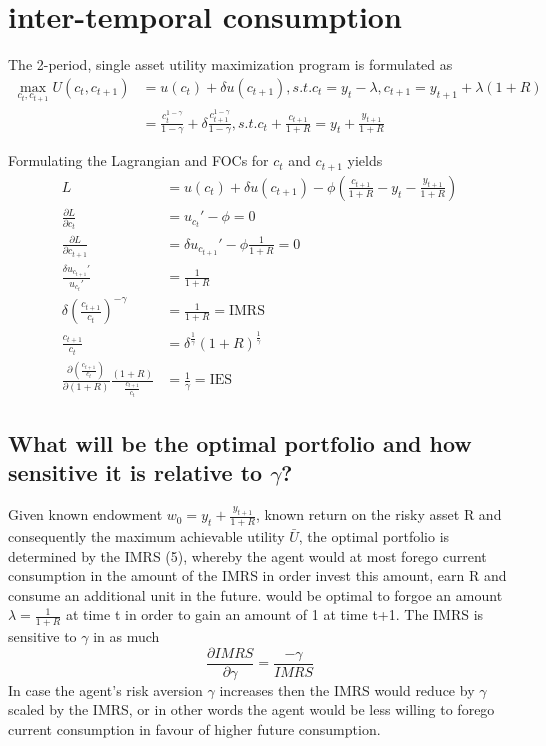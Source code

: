 \documentclass[]{article}
\begin{document}
\section{inter-temporal consumption}
The 2-period, single asset utility maximization program is formulated as
\begin{align*}
	\max_{c_t, c_{t+1}} U(c_t, c_{t+1}) &= u(c_t) + \delta u(c_{t+1}), s.t. c_t = y_t - \lambda, c_{t+1} = y_{t+1} + \lambda (1+R)\\
	&= \frac{c_t^{1-\gamma}}{1-\gamma} + \delta \frac{c_{t+1}^{1-\gamma}}{1-\gamma}, s.t. c_t + \frac{c_{t+1}}{1+R} = y_t + \frac{y_{t+1}}{1+R}
\end{align*}

Formulating the Lagrangian and FOCs for $c_t$ and $c_{t+1}$ yields
\begin{align}
	L &= u(c_t) + \delta u(c_{t+1}) - \phi (\frac{c_{t+1}}{1+R} - y_t - \frac{y_{t+1}}{1+R})\\
	\frac{\partial L}{\partial c_t} &= u_{c_t}' - \phi = 0\\
	\frac{\partial L}{\partial c_{t+1}} &= \delta u_{c_{t+1}}' - \phi \frac{1}{1+R}= 0\\
	\frac{\delta u_{c_{t+1}}'}{u_{c_t}'} &= \frac{1}{1+R}\\
	\delta \left( \frac{c_{t+1}}{c_t} \right)^{-\gamma} &= \frac{1}{1+R} = \text{IMRS}\\
	\frac{c_{t+1}}{c_t} &= \delta^{\frac{1}{\gamma}}(1+R)^{\frac{1}{\gamma}}\\
	\frac{\partial(\frac{c_{t+1}}{c_t})}{\partial(1+R)} \frac{(1+R)}{\frac{c_{t+1}}{c_t}} &= \frac{1}{\gamma} = \text{IES}
\end{align}

\subsection{What will be the optimal portfolio and how sensitive it is relative to $\gamma$?}
Given known endowment $w_0 = y_t + \frac{y_{t+1}}{1+R}$, known return on the risky asset R and consequently the maximum achievable utility $\bar{U}$, the optimal portfolio is determined by the IMRS (5), whereby the agent would at most forego current consumption in the amount of the IMRS in order invest this amount, earn R and consume an additional unit in the future.  would be optimal to forgoe an amount $\lambda = \frac{1}{1+R}$ at time t in order to gain an amount of 1 at time t+1. The IMRS is sensitive to $\gamma$ in as much $$\frac{\partial IMRS}{\partial \gamma} = \frac{-\gamma}{IMRS}$$ In case the agent's risk aversion $\gamma$ increases then the IMRS would reduce by $\gamma$ scaled by the IMRS, or in other words the agent would be less willing to forego current consumption in favour of higher future consumption.
\end{document}
